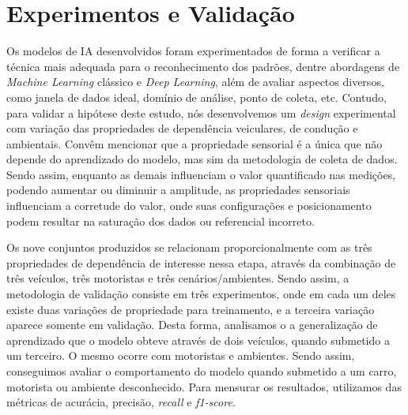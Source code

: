 \section{Experimentos e Validação}

Os modelos de IA desenvolvidos foram experimentados de forma a verificar a técnica mais adequada para o reconhecimento dos padrões, dentre abordagens de \textit{Machine Learning} clássico e \textit{Deep Learning}, além de avaliar aspectos diversos, como janela de dados ideal, domínio de análise, ponto de coleta, etc. Contudo, para validar a hipótese deste estudo, nós desenvolvemos um \textit{design} experimental com variação das propriedades de dependência veiculares, de condução e ambientais. Convêm mencionar que a propriedade sensorial é a única que não depende do aprendizado do modelo, mas sim da metodologia de coleta de dados. Sendo assim, enquanto as demais influenciam o valor quantificado nas medições, podendo aumentar ou diminuir a amplitude, as propriedades sensoriais influenciam a corretude do valor, onde suas configurações e posicionamento podem resultar na saturação dos dados ou referencial incorreto.
 
Os nove conjuntos produzidos se relacionam proporcionalmente com as três propriedades de dependência de interesse nessa etapa, através da combinação de três veículos, três motoristas e três cenários/ambientes. Sendo assim, a metodologia de validação consiste em três experimentos, onde em cada um deles existe duas variações de propriedade para treinamento, e a terceira variação aparece somente em validação. Desta forma, analisamos o a generalização de aprendizado que o modelo obteve através de dois veículos, quando submetido a um terceiro. O mesmo ocorre com motoristas e ambientes. Sendo assim, conseguimos avaliar o comportamento do modelo quando submetido a um carro, motorista ou ambiente desconhecido. Para mensurar os resultados, utilizamos das métricas de acurácia, precisão, \textit{recall} e \textit{f1-score}.